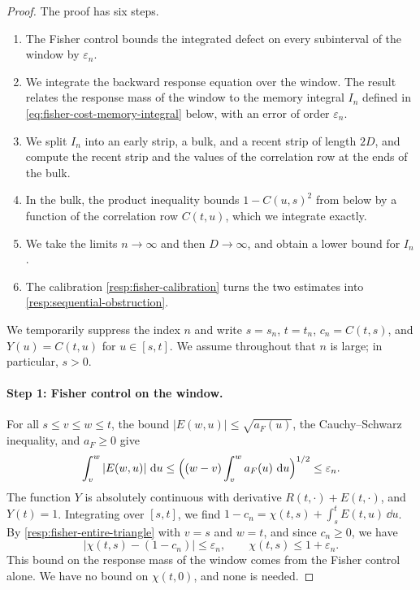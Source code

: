 \begin{proof}
The proof has six steps.
\begin{enumerate}
\item The Fisher control bounds the integrated defect on every subinterval of the window by $\varepsilon_n$.
\item We integrate the backward response equation over the window. The result relates the response mass of the window to the memory integral $I_n$ defined in \eqref{eq:fisher-cost-memory-integral} below, with an error of order $\varepsilon_n$.
\item We split $I_n$ into an early strip, a bulk, and a recent strip of length $2D$, and compute the recent strip and the values of the correlation row at the ends of the bulk.
\item In the bulk, the product inequality bounds $1-C(u,s)^2$ from below by a function of the correlation row $C(t,u)$, which we integrate exactly.
\item We take the limits $n\to\infty$ and then $D\to\infty$, and obtain a lower bound for $I_n$.
\item The calibration \eqref{resp:fisher-calibration} turns the two estimates into \eqref{resp:sequential-obstruction}.
\end{enumerate}
We temporarily suppress the index $n$ and write $s=s_n$, $t=t_n$, $c_n=C(t,s)$, and $Y(u)=C(t,u)$ for $u\in[s,t]$. We assume throughout that $n$ is large; in particular, $s>0$.

\paragraph{Step 1: Fisher control on the window.}
For all $s\le v\le w\le t$, the bound $|E(w,u)|\le\sqrt{a_F(u)}$, the Cauchy--Schwarz inequality, and $a_F\ge0$ give
\begin{equation}
 \int_v^w|E(w,u)|\,\mathop{}\!\mathrm d u\le\Bigl((w-v)\int_v^wa_F(u)\,\mathop{}\!\mathrm d u\Bigr)^{1/2}\le\varepsilon_n .
 \label{resp:fisher-entire-triangle}
\end{equation}
The function $Y$ is absolutely continuous with derivative $R(t,\cdot)+E(t,\cdot)$, and $Y(t)=1$. Integrating over $[s,t]$, we find $1-c_n=\chi(t,s)+\int_s^tE(t,u)\,\dd u$. By \eqref{resp:fisher-entire-triangle} with $v=s$ and $w=t$, and since $c_n\ge0$, we have
\begin{equation}
 |\chi(t,s)-(1-c_n)|\le\varepsilon_n,
 \qquad \chi(t,s)\le1+\varepsilon_n .
 \label{resp:fisher-chi-bound}
\end{equation}
This bound on the response mass of the window comes from the Fisher control alone. We have no bound on $\chi(t,0)$, and none is needed.


\end{proof}
